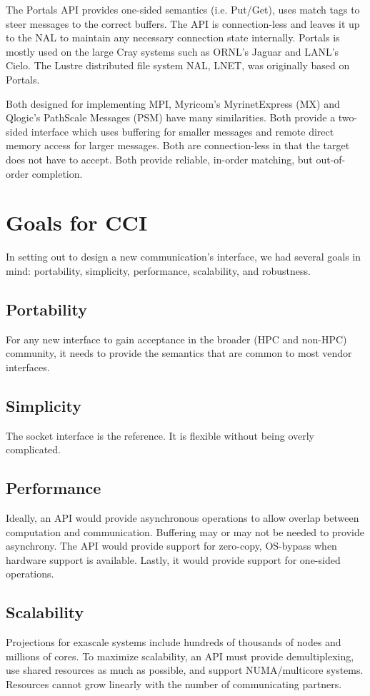 \documentclass[conference]{IEEEtran}
\begin{document}
The Portals API provides one-sided semantics (i.e.  Put/Get), uses match tags to steer
messages to the correct buffers. The API is connection-less and leaves it up to the NAL to
maintain any necessary connection state internally. Portals is mostly used on the large
Cray systems such as ORNL's Jaguar\cite{jaguar} and LANL's Cielo\cite{cielo}.  The
Lustre distributed file system NAL, LNET, was originally based on Portals\cite{lnet}.

Both designed for implementing MPI, Myricom's MyrinetExpress (MX) and Qlogic's PathScale
Messages (PSM) have many similarities. Both provide a two-sided interface which uses
buffering for smaller messages and remote direct memory access for larger messages.  Both
are connection-less in that the target does not have to accept.  Both provide reliable,
in-order matching, but out-of-order completion.

\section{Goals for CCI}
In setting out to design a new communication's interface, we had several goals in mind:
portability, simplicity, performance, scalability, and robustness.

\subsection{Portability}
For any new interface to gain acceptance in the broader (HPC and non-HPC) community, it
needs to provide the semantics that are common to most vendor interfaces.

\subsection{Simplicity}
The socket interface is the reference. It is flexible without being overly
complicated.

\subsection{Performance}
Ideally, an API would provide asynchronous operations to allow overlap between computation
and communication. Buffering may or may not be needed to provide asynchrony. The API would
provide support for zero-copy, OS-bypass when hardware support is available. Lastly, it
would provide support for one-sided operations.

\subsection{Scalability}
Projections for exascale systems include hundreds of thousands of nodes and millions of
cores\cite{dongarra:exascale-talk-2010}. To maximize scalability, an API must provide
demultiplexing, use shared resources as much
as possible, and support NUMA/multicore systems. Resources cannot grow linearly with the
number of communicating partners.
\end{document}
